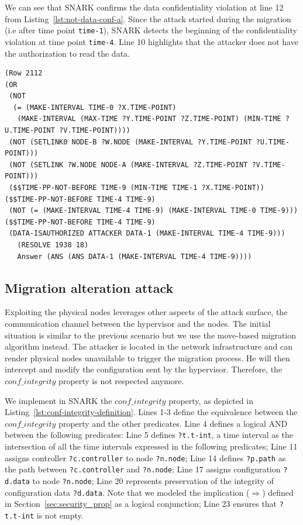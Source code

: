 We can see that SNARK confirms the data confidentiality violation at line 12 from Listing~\ref{lst:not-data-conf-a}.
Since the attack started during the migration (i.e after time point \verb'time-1'), SNARK detects the beginning of the confidentiality violation at time point \verb'time-4'.
Line 10 highlights that the attacker does not have the authorization to read the data.

\begin{lstlisting}[caption=SNARK detecting the data confidentiality violation., label=lst:not-data-conf-a,captionpos=b] 
(Row 2112  
(OR
 (NOT
  (= (MAKE-INTERVAL TIME-0 ?X.TIME-POINT)
   (MAKE-INTERVAL (MAX-TIME ?Y.TIME-POINT ?Z.TIME-POINT) (MIN-TIME ?U.TIME-POINT ?V.TIME-POINT))))
 (NOT (SETLINK0 NODE-B ?W.NODE (MAKE-INTERVAL ?Y.TIME-POINT ?U.TIME-POINT)))
 (NOT (SETLINK ?W.NODE NODE-A (MAKE-INTERVAL ?Z.TIME-POINT ?V.TIME-POINT)))
 ($$TIME-PP-NOT-BEFORE TIME-9 (MIN-TIME TIME-1 ?X.TIME-POINT)) ($$TIME-PP-NOT-BEFORE TIME-4 TIME-9)
 (NOT (= (MAKE-INTERVAL TIME-4 TIME-9) (MAKE-INTERVAL TIME-0 TIME-9))) ($$TIME-PP-NOT-BEFORE TIME-4 TIME-9)
 (DATA-ISAUTHORIZED ATTACKER DATA-1 (MAKE-INTERVAL TIME-4 TIME-9)))
   (RESOLVE 1938 18)
   Answer (ANS (ANS DATA-1 (MAKE-INTERVAL TIME-4 TIME-9)))) 
\end{lstlisting}


\subsection{Migration alteration attack}
Exploiting the physical nodes leverages other aspects of the attack surface, \eg the communication channel between the hypervisor and the nodes.
The initial situation is similar to the previous scenario but we use the move-based migration algorithm instead.
The attacker is located in the network infrastructure and can render physical nodes unavailable to trigger the migration process. He will then intercept and modify the configuration sent by the hypervisor. 
Therefore, the $conf\_integrity$ property is not respected anymore.

We implement in SNARK the $conf\_integrity$ property, as depicted in Listing~\ref{lst:conf-integrity-definition}.
Lines 1-3 define the equivalence between the $conf\_integrity$ property and the other predicates.
Line 4 defines a logical AND between the following predicates:
Line 5 defines \verb'?t.t-int', a time interval as the intersection of all the time intervals expressed in the following predicates;
Line 11 assigns controller \verb'?c.controller' to node \verb'?n.node';
Line 14 defines \verb'?p.path' as the path between \verb'?c.controller' and \verb'?n.node';
Line 17 assigns configuration \verb'?d.data' to node \verb'?n.node';
Line 20 represents preservation of the integrity of configuration data \verb'?d.data'.
Note that we modeled the implication ($\Rightarrow$) defined in Section~\ref{sec:security_prop} as a logical conjunction;
Line 23 ensures that \verb'?t.t-int' is not empty.

